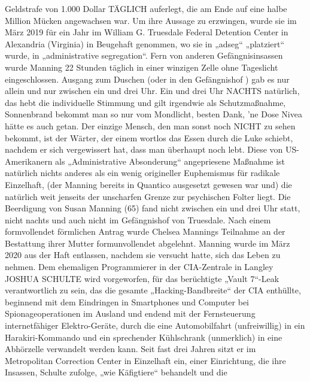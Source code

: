 \begin{multicols}{2}
Geldstrafe von 1.000 Dollar TÄGLICH auferlegt, die am
Ende auf eine halbe Million Mücken angewachsen war.
Um ihre Aussage zu erzwingen, wurde sie im März 2019
für ein Jahr im William G. Truesdale Federal Detention
Center in Alexandria (Virginia) in Beugehaft genommen,
wo sie in „adseg“ „platziert“ wurde, in „administrative segregation“. Fern von anderen Gefängnisinsassen wurde
Manning 22 Stunden täglich in einer winzigen Zelle ohne
Tageslicht eingeschlossen. Ausgang zum Duschen (oder
in den Gefängnishof ) gab es nur allein und nur zwischen
ein und drei Uhr. Ein und drei Uhr NACHTS natürlich,
das hebt die individuelle Stimmung und gilt irgendwie
als Schutzmaßnahme, Sonnenbrand bekommt man so
nur vom Mondlicht, besten Dank, ’ne Dose Nivea hätte
es auch getan. Der einzige Mensch, den man sonst noch
NICHT zu sehen bekommt, ist der Wärter, der einem
wortlos das Essen durch die Luke schiebt, nachdem er
sich vergewissert hat, dass man überhaupt noch lebt.
Diese von US-Amerikanern als „Administrative Absonderung“ angepriesene Maßnahme ist natürlich nichts
anderes als ein wenig origineller Euphemismus für radikale Einzelhaft, (der Manning bereits in Quantico ausgesetzt gewesen war und) die natürlich weit jenseits der
unscharfen Grenze zur psychischen Folter liegt.
Die Beerdigung von Susan Manning (65) fand nicht
zwischen ein und drei Uhr statt, nicht nachts und auch
nicht im Gefängnishof von Truesdale. Nach einem formvollendet förmlichen Antrag wurde Chelsea Mannings
Teilnahme an der Bestattung ihrer Mutter formunvollendet abgelehnt. Manning wurde im März 2020 aus der
Haft entlassen, nachdem sie versucht hatte, sich das Leben zu nehmen.
Dem ehemaligen Programmierer in der CIA-Zentrale in
Langley JOSHUA SCHULTE wird vorgeworfen, für das
berüchtigte „Vault 7“-Leak verantwortlich zu sein, das
die gesamte „Hacking-Bandbreite“ der CIA enthüllte, beginnend mit dem Eindringen in Smartphones und Computer bei Spionageoperationen im Ausland und endend
mit der Fernsteuerung internetfähiger Elektro-Geräte,
durch die eine Automobilfahrt (unfreiwillig) in ein Harakiri-Kommando und ein sprechender Kühlschrank (unmerklich) in eine Abhörzelle verwandelt werden kann.
Seit fast drei Jahren sitzt er im Metropolitan Correction
Center in Einzelhaft ein, einer Einrichtung, die ihre Insassen, Schulte zufolge, „wie Käfigtiere“ behandelt und die


\end{multicols}
